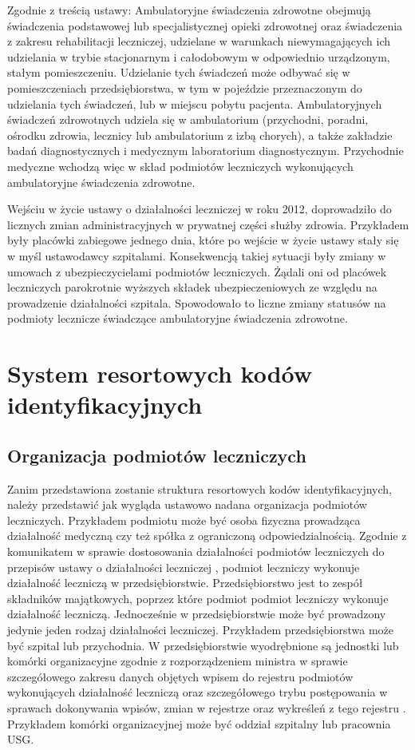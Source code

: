 Zgodnie z treścią ustawy: Ambulatoryjne świadczenia zdrowotne obejmują świadczenia podstawowej lub specjalistycznej opieki zdrowotnej oraz świadczenia z zakresu rehabilitacji leczniczej, udzielane w warunkach niewymagających ich udzielania w trybie stacjonarnym i całodobowym w odpowiednio urządzonym, stałym pomieszczeniu. Udzielanie tych świadczeń może odbywać się w pomieszczeniach przedsiębiorstwa, w tym w pojeździe przeznaczonym do udzielania tych świadczeń, lub w miejscu pobytu pacjenta.
Ambulatoryjnych świadczeń zdrowotnych udziela się w ambulatorium (przychodni, poradni, ośrodku zdrowia, lecznicy lub ambulatorium z izbą chorych), a także zakładzie badań diagnostycznych i medycznym laboratorium diagnostycznym.  
Przychodnie medyczne wchodzą więc w skład podmiotów leczniczych wykonujących ambulatoryjne świadczenia zdrowotne. 

Wejściu w życie ustawy o działalności leczniczej \cite{mz:udl:online} w roku 2012, doprowadziło do licznych zmian administracyjnych w prywatnej części służby zdrowia. Przykładem były placówki zabiegowe jednego dnia, które po wejście w życie ustawy stały się w myśl ustawodawcy szpitalami. Konsekwencją takiej sytuacji były zmiany w umowach z ubezpieczycielami podmiotów leczniczych. Żądali oni od placówek leczniczych parokrotnie wyższych składek ubezpieczeniowych ze względu na prowadzenie działalności szpitala. Spowodowało to liczne zmiany statusów na podmioty lecznicze świadczące ambulatoryjne świadczenia zdrowotne. 


\section[System resortowych kodów identyfikacyjnych][System resortowych kodów identyfikacyjnych]{System resortowych kodów identyfikacyjnych}

\subsection{Organizacja podmiotów leczniczych} 
\label{subsec:org_pod_lecz}
Zanim przedstawiona zostanie struktura resortowych kodów identyfikacyjnych, należy przedstawić jak wygląda ustawowo nadana organizacja podmiotów leczniczych. Przykładem podmiotu może być osoba fizyczna prowadząca działalność medyczną czy też spółka z ograniczoną odpowiedzialnością. Zgodnie z komunikatem w sprawie dostosowania działalności podmiotów leczniczych do przepisów ustawy o działalności leczniczej \cite{mz:kdp:online}, podmiot leczniczy wykonuje działalność leczniczą w przedsiębiorstwie. Przedsiębiorstwo jest to zespół składników majątkowych, poprzez które podmiot podmiot leczniczy wykonuje działalność leczniczą. Jednocześnie w przedsiębiorstwie może być prowadzony jedynie jeden rodzaj działalności leczniczej. Przykładem przedsiębiorstwa może być szpital lub przychodnia. W przedsiębiorstwie wyodrębnione są jednostki lub komórki organizacyjne zgodnie z rozporządzeniem ministra w sprawie szczegółowego zakresu danych objętych wpisem do rejestru podmiotów wykonujących działalność leczniczą oraz szczegółowego trybu postępowania w sprawach dokonywania wpisów, zmian w rejestrze oraz wykreśleń z tego rejestru \cite{mz:zdr:online}. Przykładem komórki organizacyjnej może być oddział szpitalny lub pracownia USG. 

